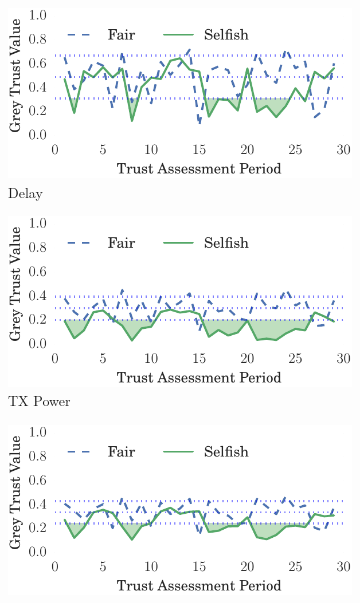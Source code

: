 \documentclass[conference]{IEEEtran}
\begin{document}
\begin{figure}[h]
\begin{subfigure}{0.5\textwidth}
  \centering
  \includegraphics[width=.95\linewidth]{img/trust_bella_static_emph_ADelay_BadMouthingPowerControl.pdf}
  \caption{Delay}
  \label{fig:static_badmouthing_delay}
\end{subfigure}
\begin{subfigure}{0.5\textwidth}
\centering
  \includegraphics[width=.95\linewidth]{img/trust_bella_static_emph_ATXP_BadMouthingPowerControl.pdf}
  \caption{TX Power}
  \label{fig:static_badmouthing_txp}
\end{subfigure}
\begin{subfigure}{0.5\textwidth}
\centering
  \includegraphics[width=.95\linewidth]{img/trust_bella_static_emph_RXThroughput_BadMouthingPowerControl.pdf}

\end{subfigure}
\end{figure}
\end{document}
